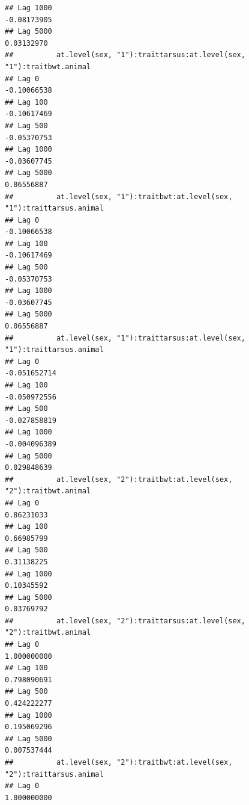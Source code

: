 \documentclass[
  12pt,
]{book}
\begin{document}
\begin{verbatim}
## Lag 1000                                                    -0.08173905
## Lag 5000                                                     0.03132970
##          at.level(sex, "1"):traittarsus:at.level(sex, "1"):traitbwt.animal
## Lag 0                                                          -0.10066538
## Lag 100                                                        -0.10617469
## Lag 500                                                        -0.05370753
## Lag 1000                                                       -0.03607745
## Lag 5000                                                        0.06556887
##          at.level(sex, "1"):traitbwt:at.level(sex, "1"):traittarsus.animal
## Lag 0                                                          -0.10066538
## Lag 100                                                        -0.10617469
## Lag 500                                                        -0.05370753
## Lag 1000                                                       -0.03607745
## Lag 5000                                                        0.06556887
##          at.level(sex, "1"):traittarsus:at.level(sex, "1"):traittarsus.animal
## Lag 0                                                            -0.051652714
## Lag 100                                                          -0.050972556
## Lag 500                                                          -0.027858819
## Lag 1000                                                         -0.004096389
## Lag 5000                                                          0.029848639
##          at.level(sex, "2"):traitbwt:at.level(sex, "2"):traitbwt.animal
## Lag 0                                                        0.86231033
## Lag 100                                                      0.66985799
## Lag 500                                                      0.31138225
## Lag 1000                                                     0.10345592
## Lag 5000                                                     0.03769792
##          at.level(sex, "2"):traittarsus:at.level(sex, "2"):traitbwt.animal
## Lag 0                                                          1.000000000
## Lag 100                                                        0.798090691
## Lag 500                                                        0.424222277
## Lag 1000                                                       0.195069296
## Lag 5000                                                       0.007537444
##          at.level(sex, "2"):traitbwt:at.level(sex, "2"):traittarsus.animal
## Lag 0                                                          1.000000000

\end{verbatim}
\end{document}
